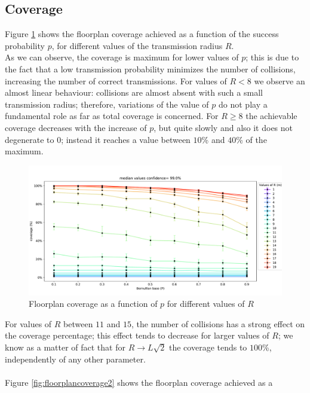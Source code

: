 \subsection{Coverage}
Figure \ref{fig:floorplancoverage1} shows the floorplan coverage achieved as a
function of the success probability $p$, for different values of
the transmission radius $R$. \\
As we can observe, the coverage is maximum
for lower values of $p$; this is due to the fact that a low transmission
probability minimizes the number of collisions, increasing the number of correct
transmissions. For values of $R < 8$ we observe an almost linear behaviour:
collisions are almost absent with such a small transmission radius; therefore,
variations of the value of $p$ do not play a fundamental role as far as total coverage is
concerned. For $R \geq 8$ the achievable coverage
decreases with the increase of $p$, but quite slowly and also it does not
degenerate to $0$; instead it reaches a value between $10$\% and $40$\% of the
maximum.
\begin{figure}[H]
    \begin{center}
        \includegraphics[scale=.42]{img/Big_CovP_median.pdf}
    \end{center}
    \vspace*{-0.5cm}
    \caption{Floorplan coverage as a function of $p$ for different values of $R$}
    \label{fig:floorplancoverage1}
\end{figure}
\noindent
For values of $R$ between $11$ and $15$, the number of collisions has a strong
effect on the coverage percentage; this effect tends to decrease for larger
values of $R$; we know as a matter of fact that for $R \to L\sqrt{2}$ the
coverage tends to $100$\%, independently of any other parameter.\\
\\
Figure \ref{fig:floorplancoverage2} shows the floorplan coverage achieved as a
